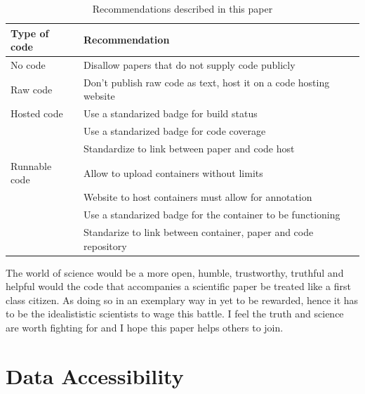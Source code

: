 \begin{table}[h]
  \begin{tabular}{|p{2cm}|l|}
    \hline
    \textbf{Type of code} & \textbf{Recommendation} \\
    \hline
    No code       & Disallow papers that do not supply code publicly \\
    \hline
    Raw code      & Don't publish raw code as text, host it on a code hosting website \\
    \hline
    Hosted code   & Use a standarized badge for build status \\
                  & Use a standarized badge for code coverage \\
                  & Standardize to link between paper and code host \\
    \hline
    Runnable code & Allow to upload containers without limits \\
                  & Website to host containers must allow for annotation \\
                  & Use a standarized badge for the container to be functioning  \\
                  & Standarize to link between container, paper and code repository \\
    \hline
  \end{tabular}
  \caption{Recommendations described in this paper}
  \label{tab:recommendations}
\end{table}


The world of science would be a more open, humble, trustworthy, truthful
and helpful would the code that accompanies a scientific paper
be treated like a first class citizen. As doing so in an exemplary way
in yet to be rewarded, hence it has to be the idealististic scientists
to wage this battle. I feel the truth and science are worth fighting for
and I hope this paper helps others to join.

\section{Data Accessibility}


